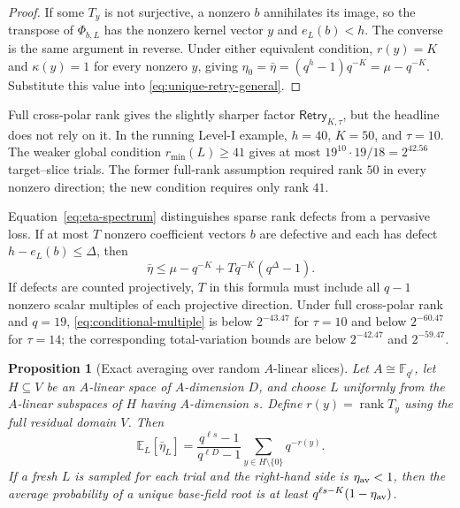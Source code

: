 \documentclass[11pt]{article}
\newtheorem{proposition}[proposition]{Proposition}
\newcommand{\F}{\mathbb F}
\newcommand{\rank}{\operatorname{rank}}
\begin{document}
\begin{proof}
If some $T_y$ is not surjective, a nonzero $b$ annihilates its image, so the
transpose of $\Phi_{b,L}$ has the nonzero kernel vector $y$ and $e_L(b)<h$.  The
converse is the same argument in reverse.  Under either equivalent condition,
$r(y)=K$ and $\kappa(y)=1$ for every nonzero $y$, giving
$\eta_0=\bar\eta=(q^h-1)q^{-K}=\mu-q^{-K}$.  Substitute this value into
\eqref{eq:unique-retry-general}.
\end{proof}

Full cross-polar rank gives the slightly sharper factor
$\mathsf{Retry}_{K,\tau}$, but the headline does not rely on it.  In the
running Level-I example, $h=40$, $K=50$, and $\tau=10$.  The weaker global
condition $r_{\min}(L)\ge41$ gives at most
$19^{10}\cdot19/18=2^{42.56}$ target--slice trials.  The former full-rank
assumption required rank $50$ in every nonzero direction; the new condition
requires only rank $41$.

Equation~\eqref{eq:eta-spectrum} distinguishes sparse rank defects from a
pervasive loss.  If at most $T$ nonzero coefficient vectors $b$ are defective
and each has defect $h-e_L(b)\le\Delta$, then
\begin{equation}\label{eq:defect-spectrum}
 \bar\eta\le
 \mu-q^{-K}+Tq^{-K}(q^\Delta-1).
\end{equation}
If defects are counted projectively, $T$ in this formula must include all
$q-1$ nonzero scalar multiples of each projective direction.  Under full
cross-polar rank and $q=19$, \eqref{eq:conditional-multiple} is below
$2^{-43.47}$ for $\tau=10$ and below $2^{-60.47}$ for $\tau=14$; the
corresponding total-variation bounds are below $2^{-42.47}$ and $2^{-59.47}$.


\begin{proposition}[Exact averaging over random $A$-linear slices]
\label{prop:random-A-slice}
Let $A\cong\F_{q^\ell}$, let $H\subseteq V$ be an $A$-linear space of
$A$-dimension $D$, and choose $L$ uniformly from the $A$-linear subspaces of
$H$ having $A$-dimension $s$.  Define $r(y)=\rank T_y$ using the full residual
domain $V$.  Then
\begin{equation}\label{eq:random-slice-average}
 \mathbb E_L[\bar\eta_L]
 =\frac{q^{\ell s}-1}{q^{\ell D}-1}
   \sum_{y\in H\setminus\{0\}}q^{-r(y)}.
\end{equation}
If a fresh $L$ is sampled for each trial and the right-hand side is
$\eta_{\rm av}<1$, then the average probability of a unique base-field root is
at least $q^{\ell s-K}(1-\eta_{\rm av})$.
\end{proposition}
\end{document}
